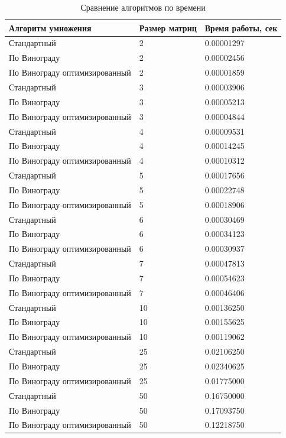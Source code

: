 \documentclass[12pt]{report}
\begin{document}
\begin{table}[H]
	\caption{\label{tab:canonsummary}Сравнение алгоритмов по времени}
	\begin{center}
\begin{tabular}{ | l | l | l | }
	\hline
	Алгоритм умножения & Размер матриц & Время работы, сек \\ \hline
	Стандартный & 2 & 0.00001297 \\
	По Винограду & 2 & 0.00002456 \\
	По Винограду оптимизированный & 2 & 0.00001859 \\
	Стандартный & 3 & 0.00003906 \\
	По Винограду & 3 & 0.00005213 \\
	По Винограду оптимизированный & 3 & 0.00004844 \\
	Стандартный & 4 & 0.00009531 \\
	По Винограду & 4 & 0.00014245 \\
	По Винограду оптимизированный & 4 & 0.00010312 \\
	Стандартный & 5 & 0.00017656 \\
	По Винограду & 5 & 0.00022748 \\
	По Винограду оптимизированный & 5 & 0.00018906 \\
	Стандартный & 6 & 0.00030469 \\
	По Винограду & 6 & 0.00034123 \\
	По Винограду оптимизированный & 6 & 0.00030937 \\
	Стандартный & 7 & 0.00047813 \\
	По Винограду & 7 & 0.00054623 \\
	По Винограду оптимизированный & 7 & 0.00046406 \\
	Стандартный & 10 & 0.00136250 \\
	По Винограду & 10 & 0.00155625 \\
	По Винограду оптимизированный & 10 & 0.00119062 \\
	Стандартный & 25 & 0.02106250 \\
	По Винограду & 25 & 0.02340625 \\
	По Винограду оптимизированный & 25 & 0.01775000 \\
	Стандартный & 50 & 0.16750000 \\
	По Винограду & 50 & 0.17093750 \\
	По Винограду оптимизированный & 50 & 0.12218750 \\
	\hline
\end{tabular}
\end{center}
\end{table} 
\end{document}
